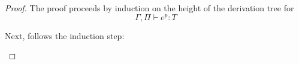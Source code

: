 \documentclass[../../../master.tex]{subfiles}
\begin{document}
\begin{proof}
	The proof proceeds by induction on the height of the derivation tree for 
	$$\Gamma,\Pi\vdash e^{p}:T$$
	\begin{description}
		\item[]

		\item[]
	\end{description}

	Next, follows the induction step:
	\begin{description}
		\item[]
		
		\item[]

		\item[]

		\item[]

		\item[]

		\item[]

		\item[]

		\item[]

		\item[]

		\item[]
	\end{description}
\end{proof}
\end{document}
